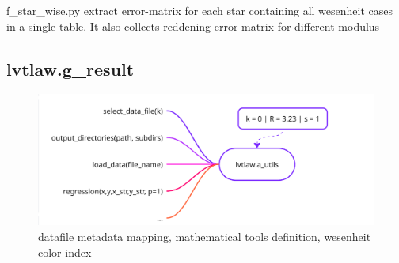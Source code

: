 \documentclass{article}
\begin{document}
f\_star\_wise.py extract error-matrix for each star containing all wesenheit cases in a single table. It also collects reddening error-matrix for different modulus



\newpage
\subsection{lvtlaw.g\_result}
\begin{figure}[h!]
\includegraphics[width=\textwidth]{./figures/g_result.png}
\caption{\small datafile metadata mapping, mathematical tools definition, wesenheit color index}
\end{figure}
\end{document}
